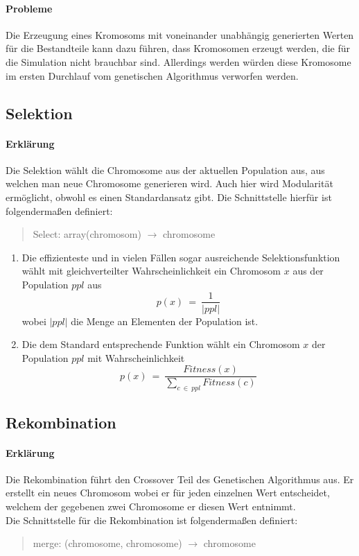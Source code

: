 \documentclass[12pt,a4paper]{scrartcl}
\begin{document}
\paragraph{Probleme}
Die Erzeugung eines Kromosoms mit voneinander unabhängig generierten Werten für die Bestandteile kann dazu führen, dass Kromosomen erzeugt werden, die für die Simulation nicht brauchbar sind. Allerdings werden würden diese Kromosome im ersten Durchlauf vom genetischen Algorithmus verworfen werden.

\subsection{Selektion}
\paragraph{Erklärung}
Die Selektion wählt die Chromosome aus der aktuellen Population aus, aus welchen man neue Chromosome generieren wird. Auch hier wird Modularität ermöglicht, obwohl es einen Standardansatz gibt. Die Schnittstelle hierfür ist folgendermaßen definiert:
\begin{quote}
 \textsf{Select: array(chromosom) $\rightarrow$ chromosome}
\end{quote}
\begin{enumerate}
	\item Die effizienteste und in vielen Fällen sogar ausreichende Selektionsfunktion wählt mit gleichverteilter Wahrscheinlichkeit ein Chromosom $x$ aus der Population $ppl$ aus $$p(x) ~=~ \frac{1}{|ppl|}$$ wobei $|ppl|$ die Menge an Elementen der Population ist.
	\item Die dem Standard entsprechende Funktion wählt ein Chromosom $x$ der Population $ppl$ mit Wahrscheinlichkeit $$p(x)~=~\frac{Fitness(x)}{\sum_{c ~\in~ ppl}^{}{Fitness(c)}}$$
\end{enumerate}

\subsection{Rekombination}
\paragraph{Erklärung}
Die Rekombination führt den Crossover Teil des Genetischen Algorithmus aus. Er erstellt ein neues Chromosom wobei er für jeden einzelnen Wert entscheidet, welchem der gegebenen zwei Chromosome er diesen Wert entnimmt.\\
Die Schnittstelle für die Rekombination ist folgendermaßen definiert: 
\begin{quote}
	\textsf{merge: (chromosome, chromosome) $\rightarrow$ chromosome}
\end{quote}
\end{document}
